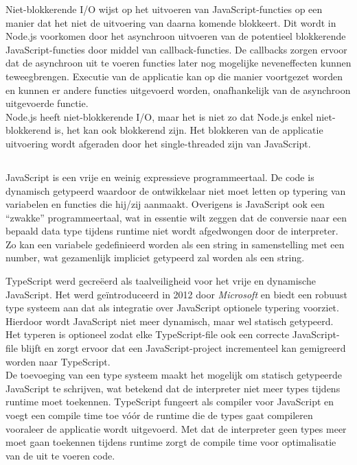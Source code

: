 Niet-blokkerende I/O wijst op het uitvoeren van JavaScript-functies op een manier dat het niet de uitvoering van daarna komende blokkeert. Dit wordt in Node.js voorkomen door het asynchroon uitvoeren van de potentieel blokkerende JavaScript-functies door middel van callback-functies. De callbacks zorgen ervoor dat de asynchroon uit te voeren functies later nog mogelijke neveneffecten kunnen teweegbrengen. Executie van de applicatie kan op die manier voortgezet worden en kunnen er andere functies uitgevoerd worden, onafhankelijk van de asynchroon uitgevoerde functie. \\
Node.js heeft niet-blokkerende I/O, maar het is niet zo dat Node.js enkel niet-blokkerend is, het kan ook blokkerend zijn. Het blokkeren van de applicatie uitvoering wordt afgeraden door het single-threaded zijn van JavaScript.

\subsection{}
\label{subsec:typescript}

JavaScript is een vrije en weinig expressieve programmeertaal. De code is dynamisch getypeerd waardoor de ontwikkelaar niet moet letten op typering van variabelen en functies die hij/zij aanmaakt. Overigens is JavaScript ook een ``zwakke'' programmeertaal, wat in essentie wilt zeggen dat de conversie naar een bepaald data type tijdens runtime niet wordt afgedwongen door de interpreter. Zo kan een variabele gedefinieerd worden als een string in samenstelling met een number, wat gezamenlijk impliciet getypeerd zal worden als een string.

TypeScript werd gecreëerd als taalveiligheid voor het vrije en dynamische JavaScript. Het werd geïntroduceerd in 2012 door \emph{Microsoft} en biedt een robuust type systeem aan dat als integratie over JavaScript optionele typering voorziet. Hierdoor wordt JavaScript niet meer dynamisch, maar wel statisch getypeerd. Het typeren is optioneel zodat elke TypeScript-file ook een correcte JavaScript-file blijft en zorgt ervoor dat een JavaScript-project incrementeel kan gemigreerd worden naar TypeScript. \\
De toevoeging van een type systeem maakt het mogelijk om statisch getypeerde JavaScript te schrijven, wat betekend dat de interpreter niet meer types tijdens runtime moet toekennen. TypeScript fungeert als compiler voor JavaScript en voegt een compile time toe vóór de runtime die de types gaat compileren vooraleer de applicatie wordt uitgevoerd. Met dat de interpreter geen types meer moet gaan toekennen tijdens runtime zorgt de compile time voor optimalisatie van de uit te voeren code.

